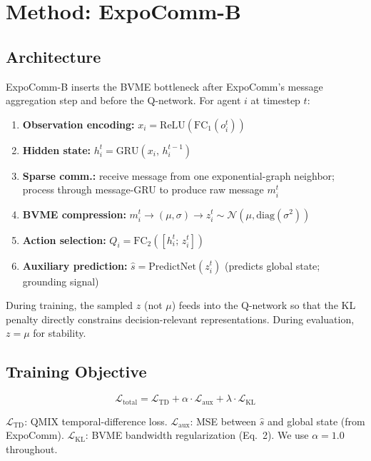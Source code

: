 \documentclass{article}
\begin{document}
\section{Method: ExpoComm-B}
\label{sec:method}

\subsection{Architecture}

ExpoComm-B inserts the BVME bottleneck after ExpoComm's message aggregation step and before the Q-network. For agent $i$ at timestep $t$:

\begin{enumerate}[noitemsep,topsep=2pt]
\item \textbf{Observation encoding:} $x_i = \text{ReLU}(\text{FC}_1(o_i^t))$
\item \textbf{Hidden state:} $h_i^t = \text{GRU}(x_i,\, h_i^{t-1})$
\item \textbf{Sparse comm.:} receive message from one exponential-graph neighbor; process through message-GRU to produce raw message $m_i^t$
\item \textbf{BVME compression:} $m_i^t \to (\mu,\sigma) \to z_i^t \sim \mathcal{N}(\mu,\text{diag}(\sigma^2))$
\item \textbf{Action selection:} $Q_i = \text{FC}_2([h_i^t;\, z_i^t])$
\item \textbf{Auxiliary prediction:} $\hat{s} = \text{PredictNet}(z_i^t)$ (predicts global state; grounding signal)
\end{enumerate}

During training, the sampled $z$ (not $\mu$) feeds into the Q-network so that the KL penalty directly constrains decision-relevant representations. During evaluation, $z = \mu$ for stability.

\subsection{Training Objective}

\begin{equation}
\mathcal{L}_\text{total} = \mathcal{L}_\text{TD} + \alpha\cdot\mathcal{L}_\text{aux} + \lambda\cdot\mathcal{L}_\text{KL}
\end{equation}

$\mathcal{L}_\text{TD}$: QMIX temporal-difference loss. $\mathcal{L}_\text{aux}$: MSE between $\hat{s}$ and global state (from ExpoComm). $\mathcal{L}_\text{KL}$: BVME bandwidth regularization (Eq.~2). We use $\alpha = 1.0$ throughout.
\end{document}
